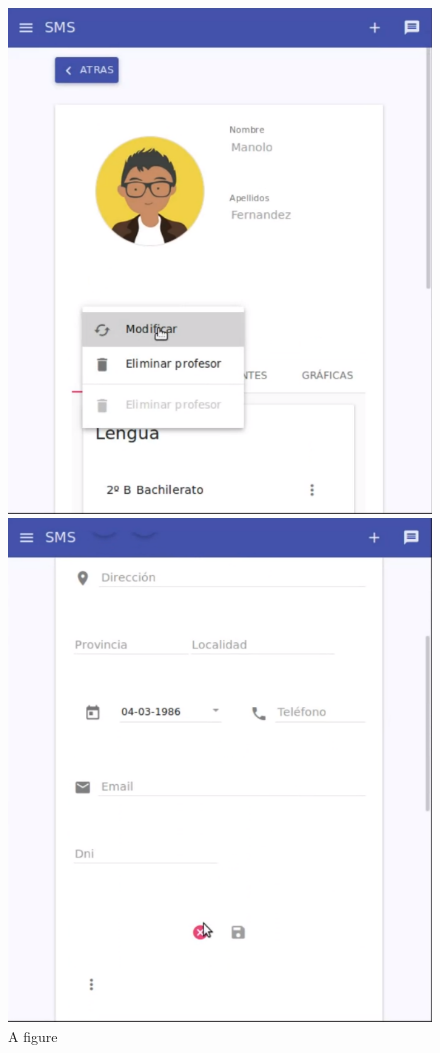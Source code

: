 \begin{figure}[H]
\centering
\begin{minipage}{.5\textwidth}
  \centering
  \includegraphics[scale=0.3]{img/snaps/teacher_profile_update.png}
  \caption{A figure}
\end{minipage}%
\begin{minipage}{.5\textwidth}
  \centering
  \includegraphics[scale=0.3]{img/snaps/teacher_profile_update2.png}

\end{minipage}
\end{figure}
